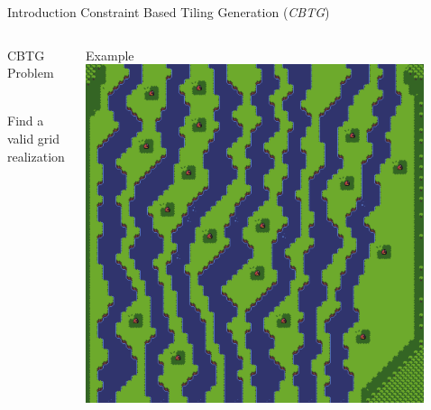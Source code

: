 \documentclass{beamer}
\begin{document}
  \begin{frame}[fragile]{Introduction}
    Constraint Based Tiling Generation (\textit{CBTG})
    \begin{columns}[T,onlytextwidth]
        \begin{block}{CBTG Problem}

          \hfill \\
          Find a valid grid realization
        \end{block}
        \begin{block}{Example}
          \includegraphics[width=0.9\textwidth]{img/forestmicro_64x64.pdf}
        \end{block}
    \end{columns}
  \end{frame}
\end{document}
